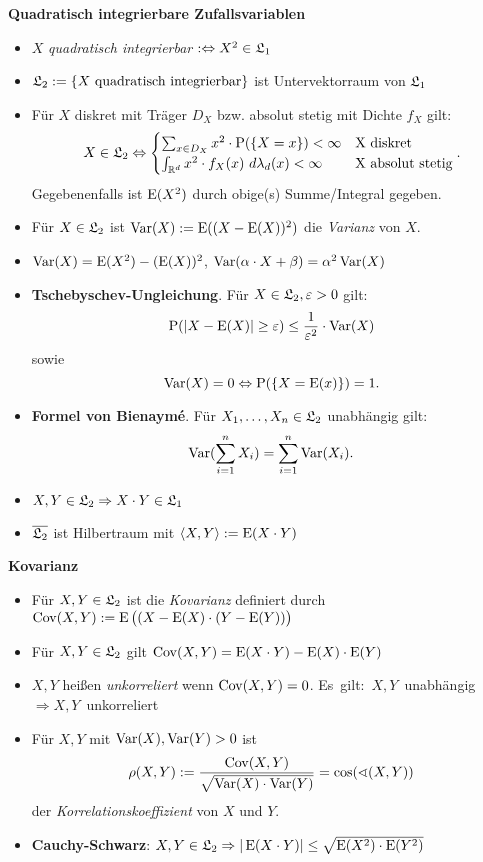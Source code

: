 \textbf{Quadratisch integrierbare Zufallsvariablen}
\begin{itemize}
\item $X$ \textit{quadratisch integrierbar} $:\Leftrightarrow X^2\in\mathfrak{L}_1$

\item $\mathfrak{L}_2:=\{X \text{ quadratisch integrierbar}\}$ ist Untervektorraum von $\mathfrak{L}_1$

\item Für $X$ diskret mit Träger $D_X$ bzw. absolut stetig mit Dichte $f_X$ gilt:
\[
	X\in\mathfrak{L}_2\Leftrightarrow
	\begin{cases}
	\sum_{x\in D_X} x^2\cdot\operatorname{P}(\{X=x\})<\infty			& \text{X diskret} \\
	\int_{\mathbb{R}^d} x^2\cdot f_X(x)~d\lambda_d(x)<\infty		& \text{X absolut stetig}
	\end{cases}.
\]
Gegebenenfalls ist $\operatorname{E}(X^2)$ durch obige(s) Summe/Integral gegeben.

\item Für $X\in\mathfrak{L}_2$ ist $\operatorname{Var}(X):=\operatorname{E}((X-\operatorname{E}(X))^2)$ die \textit{Varianz} von $X$.

\item $\operatorname{Var}(X)=\operatorname{E}(X^2)-(\operatorname{E}(X))^2$, \quad $\operatorname{Var}(\alpha\cdot X+\beta)=\alpha^2\operatorname{Var}(X)$

\item \textbf{Tschebyschev-Ungleichung}. Für $X\in\mathfrak{L}_2, \varepsilon>0$ gilt:
\[
	\operatorname{P}(|X-\operatorname{E}(X)|\geq \varepsilon)\leq \frac{1}{\varepsilon^2}\cdot\operatorname{Var}(X)
\]
sowie
\[
	\operatorname{Var}(X)=0 \Leftrightarrow \operatorname{P}(\{X=\operatorname{E}(x)\})=1.
\]

\item \textbf{Formel von Bienaymé}. Für $X_1,\ldots,X_n\in\mathfrak{L}_2$ unabhängig gilt:
\[
	\operatorname{Var}(\sum_{i=1}^n X_i) = \sum_{i=1}^n\operatorname{Var}(X_i).
\]

\item $X,Y\in\mathfrak{L}_2\Rightarrow X\cdot Y\in\mathfrak{L}_1$

\item $\overline{\mathfrak{L}_2}$ ist Hilbertraum mit $\langle X,Y\rangle :=\operatorname{E}(X\cdot Y)$
\end{itemize}
\hspace{3em}

\textbf{Kovarianz}
\begin{itemize}
\item Für $X,Y\in\mathfrak{L}_2$ ist die \textit{Kovarianz} definiert durch
\mbox{$\operatorname{Cov}(X,Y):=\operatorname{E}\big((X-\operatorname{E}(X)\cdot (Y-\operatorname{E}(Y))\big)$}

\item Für $X,Y\in\mathfrak{L}_2$ gilt $\operatorname{Cov}(X,Y)=\operatorname{E}(X\cdot Y)-\operatorname{E}(X)\cdot\operatorname{E}(Y)$

\item $X,Y$ heißen \textit{unkorreliert} wenn $\operatorname{Cov}(X,Y)=0$.
\mbox{Es gilt: $X,Y$ unabhängig $\Rightarrow X,Y$ unkorreliert}

\item Für $X,Y$ mit $\operatorname{Var}(X),\operatorname{Var}(Y)>0$ ist
\[
	\rho(X,Y):=\frac{\operatorname{Cov}(X,Y)}{\sqrt{\operatorname{Var}(X)\cdot\operatorname{Var}(Y)}} = 
	\cos(\sphericalangle (X,Y))
\]
der \textit{Korrelationskoeffizient} von $X$ und $Y$.

\item \textbf{Cauchy-Schwarz}: $X,Y\in\mathfrak{L}_2
\Rightarrow |\operatorname{E}(X\cdot Y)|\leq \sqrt{\operatorname{E}(X^2)\cdot\operatorname{E}(Y^2)}$
\end{itemize}

